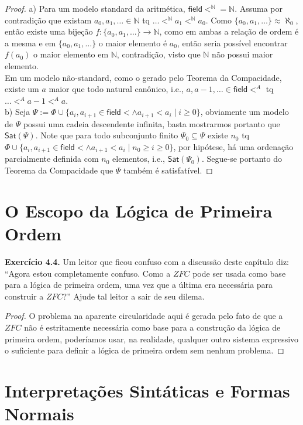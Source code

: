 \documentclass[11pt]{article}
\newcommand{\msf}[1]{\mathsf{#1}}
\newcommand{\mbb}[1]{\mathbb{#1}}
\begin{document}
\begin{proof}
    a) Para um modelo standard da aritmética, $\msf{field}<^\mbb{N}=\mbb{N}$. Assuma por contradição que existam $a_0,a_1,\dots\in\mbb{N}$ tq $\dots<^\mbb{N}a_1<^\mbb{N}a_0$. Como $\{a_0,a_1,\dots\}\approx\aleph_0$, então existe uma bijeção $f:\{a_0,a_1,\dots\}\to\mbb{N}$, como em ambas a relação de ordem é a mesma e em $\{a_0,a_1,\dots\}$ o maior elemento é $a_0$, então seria possível encontrar $f(a_0)$ o maior elemento em $\mbb{N}$, contradição, visto que $\mbb{N}$ não possui maior elemento.\\
    Em um modelo não-standard, como o gerado pelo Teorema da Compacidade, existe um $a$ maior que todo natural canônico, i.e., $a,a-1,\dots\in\msf{field}<^A$ tq $\dots<^Aa-1<^Aa$.\\
    b) Seja $\Psi:=\Phi\cup\{a_i,a_{i+1}\in\msf{field}<\wedge a_{i+1}<a_i\mid i\ge0\}$, obviamente um modelo de $\Psi$ possui uma cadeia descendente infinita, basta mostrarmos portanto que $\msf{Sat}(\Psi)$. Note que para todo subconjunto finito $\Psi_0\subseteq\Psi$ existe $n_0$ tq $\Phi\cup\{a_i,a_{i+1}\in\msf{field}<\wedge a_{i+1}<a_i\mid n_0\ge i\ge0\}$, por hipótese, há uma ordenação parcialmente definida com $n_0$ elementos, i.e., $\msf{Sat}(\Psi_0)$. Segue-se portanto do Teorema da Compacidade que $\Psi$ também é satisfatível.
\end{proof}

\section{O Escopo da Lógica de Primeira Ordem}

\begin{shaded}
\textbf{Exercício 4.4.} Um leitor que ficou confuso com a discussão deste capítulo diz: “Agora estou completamente confuso. Como a $ZFC$ pode ser usada como base para a lógica de primeira ordem, uma vez que a última era necessária para construir a $ZFC$?” Ajude tal leitor a sair de seu dilema.
\end{shaded}

\begin{proof}
    O problema na aparente circularidade aqui é gerada pelo fato de que a $ZFC$ não é estritamente necessária como base para a construção da lógica de primeira ordem, poderíamos usar, na realidade, qualquer outro sistema expressivo o suficiente para definir a lógica de primeira ordem sem nenhum problema.
\end{proof}

\section{Interpretações Sintáticas e Formas Normais}
\end{document}
